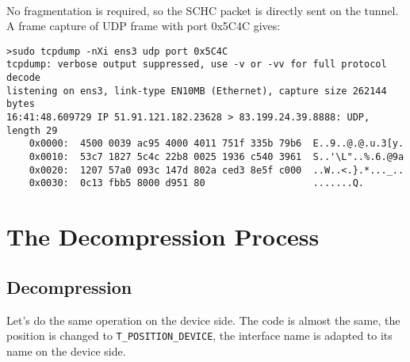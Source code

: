 \documentclass[onecolumn,12pt]{book}
\newcounter{c}
\begin{document}
~~

No fragmentation is required, so the SCHC packet is directly sent on the tunnel. A frame capture of UDP frame with port 0x5C4C gives:

\begin{lstlisting}[basicstyle=\ttfamily\scriptsize]
>sudo tcpdump -nXi ens3 udp port 0x5C4C
tcpdump: verbose output suppressed, use -v or -vv for full protocol decode
listening on ens3, link-type EN10MB (Ethernet), capture size 262144 bytes
16:41:48.609729 IP 51.91.121.182.23628 > 83.199.24.39.8888: UDP, length 29
	0x0000:  4500 0039 ac95 4000 4011 751f 335b 79b6  E..9..@.@.u.3[y.
	0x0010:  53c7 1827 5c4c 22b8 0025 1936 c540 3961  S..'\L"..%.6.@9a
	0x0020:  1207 57a0 093c 147d 802a ced3 8e5f c000  ..W..<.}.*..._..
	0x0030:  0c13 fbb5 8000 d951 80                   .......Q.

\end{lstlisting}
 
\section{The Decompression Process}

\subsection{Decompression}

Let's do the same operation on the device side. The code is almost the same, the position is changed to \texttt{T\_POSITION\_DEVICE}, the interface name is adapted to its name on the device side.
\end{document}
